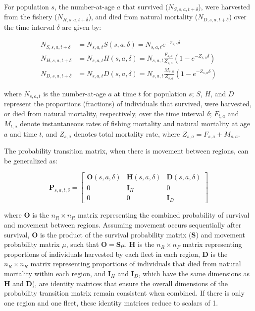 \documentclass[
  12pt,
]{article}
\begin{document}
For population \(s\), the number-at-age \(a\) that survived
(\(N_{S,s,a,t+\delta}\)), were harvested from the fishery
(\(N_{H,s,a,t+\delta}\)), and died from natural mortality
(\(N_{D,s,a,t+\delta}\)) over the time interval \(\delta\) are given by:

\setcounter{equation}{0}

\begin{equation}
\begin{aligned}
N_{S,s,a,t+\delta} &= N_{s,a,t} S(s,a,\delta) = N_{s,a,t} e^{-Z_{s,a}\delta} \\
N_{H,s,a,t+\delta} &= N_{s,a,t} H(s,a,\delta) = N_{s,a,t} \frac{F_{s,a}}{Z_{s,a}}\left(1 - e^{-Z_{s,a}\delta}\right) \\
N_{D,s,a,t+\delta} &= N_{s,a,t} D(s,a,\delta) = N_{s,a,t} \frac{M_{s,a}}{Z_{s,a}}\left(1 - e^{-Z_{s,a}\delta}\right)
\end{aligned}
\end{equation}

where \(N_{s,a,t}\) is the number-at-age \(a\) at time \(t\) for
population \(s\); \(S\), \(H\), and \(D\) represent the proportions
(fractions) of individuals that survived, were harvested, or died from
natural mortality, respectively, over the time interval \(\delta\);
\(F_{t,a}\) and \(M_{t,a}\) denote instantaneous rates of fishing
mortality and natural mortality at age \(a\) and time \(t\), and
\(Z_{s,a}\) denotes total mortality rate, where
\(Z_{s,a} = F_{s,a} + M_{s,a}\).

The probability transition matrix, when there is movement between
regions, can be generalized as:

\begin{equation}
\mathbf{P}_{s,a,t,\delta} = \begin{bmatrix}
 \mathbf{O}(s,a,\delta) & \mathbf{H}(s,a,\delta) & \mathbf{D}(s,a,\delta) \\
 0 & \mathbf{I}_{H} & 0 \\
 0 & 0 & \mathbf{I}_{D}
\end{bmatrix}
\end{equation}

where \(\mathbf{O}\) is the \(n_R \times n_R\) matrix representing the
combined probability of survival and movement between regions. Assuming
movement occurs sequentially after survival, \(\mathbf{O}\) is the
product of the survival probability matrix (\(\mathbf{S}\)) and movement
probability matrix \(\mu\), such that \(\mathbf{O} = \mathbf{S} \mu\).
\(\mathbf{H}\) is the \(n_R \times n_F\) matrix representing proportions
of individuals harvested by each fleet in each region, \(\mathbf{D}\) is
the \(n_R \times n_R\) matrix representing proportions of individuals
that died from natural mortality within each region, and
\(\mathbf{I}_{H}\) and \(\mathbf{I}_{D}\), which have the same
dimensions as \(\mathbf{H}\) and \(\mathbf{D}\)), are identity matrices
that ensure the overall dimensions of the probability transition matrix
remain consistent when combined. If there is only one region and one
fleet, these identity matrices reduce to scalars of 1.
\end{document}
